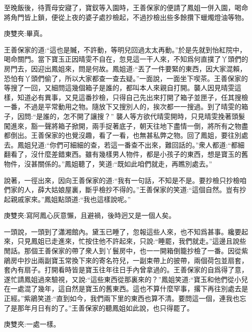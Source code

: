 \begin{parag}
    至晚飯後，待賈母安寢了，寶釵等入園時，王善保家的便請了鳳姐一併入園，喝命將角門皆上鎖，便從上夜的婆子處抄檢起，不過抄檢出些多餘攢下蠟燭燈油等物。\begin{note}庚雙夾:畢真。\end{note}王善保家的道:“這也是贓，不許動，等明兒回過太太再動。”於是先就到怡紅院中，喝命關門。當下寶玉正因晴雯不自在，忽見這一干人來，不知爲何直撲了丫頭們的房門去，因迎出鳳姐來，問是何故。鳳姐道:“丟了一件要緊的東西，因大家混賴，恐怕有丫頭們偷了，所以大家都查一查去疑。”一面說，一面坐下喫茶。王善保家的等搜了一回，又細問這幾個箱子是誰的，都叫本人來親自打開。襲人因見晴雯這樣，知道必有異事，又見這番抄檢，只得自己先出來打開了箱子並匣子，任其搜檢一番，不過是平常動用之物。隨放下又搜別人的，挨次都一一搜過。到了晴雯的箱子，因問:“是誰的，怎不開了讓搜？” 襲人等方欲代晴雯開時，只見晴雯挽著頭髮闖進來，豁一聲將箱子掀開，兩手捉著底子，朝天往地下盡情一倒，將所有之物盡都倒出。王善保家的也覺沒趣，看了一看，也無甚私弊之物。回了鳳姐，要往別處去。鳳姐兒道:“你們可細細的查，若這一番查不出來，難回話的。”衆人都道:“都細翻看了，沒什麼差錯東西。雖有幾樣男人物件，都是小孩子的東西，想是寶玉的舊物件，沒甚關係的。”鳳姐聽了，笑道:“既如此咱們就走，再瞧別處去。”
\end{parag}


\begin{parag}
    說著，一徑出來，因向王善保家的道:“我有一句話，不知是不是。要抄檢只抄檢咱們家的人，薛大姑娘屋裏，斷乎檢抄不得的。”王善保家的笑道:“這個自然。豈有抄起親戚家來。”鳳姐點頭道:“我也這樣說呢。”\begin{note}庚雙夾:寫阿鳳心灰意懶，且避禍，後時迥又是一個人矣。\end{note}一頭說，一頭到了瀟湘館內。黛玉已睡了，忽報這些人來，也不知爲甚事。纔要起來，只見鳳姐已走進來，忙按住他不許起來，只說:“睡罷，我們就走。”這邊且說些閒話。那個王善保家的帶了衆人到丫鬟房中，也一一開箱倒籠抄檢了一番。因從紫鵑房中抄出兩副寶玉常換下來的寄名符兒，一副束帶上的披帶，兩個荷包並扇套，套內有扇子。打開看時皆是寶玉往年往日手內曾拿過的。王善保家的自爲得了意，遂忙請鳳姐過來驗視，又說:“這些東西從那裏來的？”鳳姐笑道:“寶玉和他們從小兒在一處混了幾年，這自然是寶玉的舊東西。這也不算什麼罕事，撂下再往別處去是正經。”紫鵑笑道:“直到如今，我們兩下里的東西也算不清。要問這一個，連我也忘了是那年月日有的了。”王善保家的聽鳳姐如此說，也只得罷了。\begin{note}庚雙夾:一處一樣。\end{note}
\end{parag}



